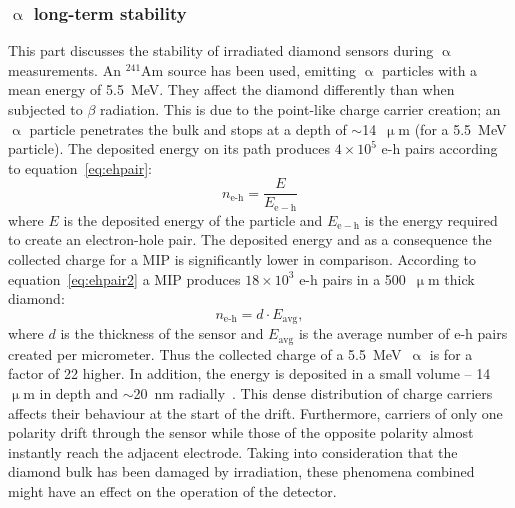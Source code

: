 \subsubsection{$\upalpha$ long-term stability}
This part discusses the stability of irradiated diamond sensors during $\upalpha$ measurements. An $^{241}$Am source has been used, emitting $\upalpha$ particles with a mean energy of 5.5~MeV. They affect the diamond differently than when subjected to $\beta$ radiation. This is due to the point-like charge carrier creation; an $\upalpha$ particle penetrates the bulk and stops at a depth of $\sim$14~$\upmu$m (for a 5.5~MeV particle). The deposited energy on its path produces $4\times10^5$ e-h pairs according to equation~\ref{eq:ehpair}:
\begin{equation} 
\label{eq:ehpair}
n_\textrm{e-h}=\frac{E}{E_\mathrm{e-h} }
\end{equation}
where $E$ is the deposited energy of the particle and $E_\mathrm{e-h}$ is the energy required to create an electron-hole pair. The deposited energy and as a consequence the collected charge for a MIP is significantly lower in comparison. According to equation~\ref{eq:ehpair2} a MIP produces $18\times10^3$ e-h pairs in a 500~$\upmu$m thick diamond:
\begin{equation} 
\label{eq:ehpair2}
n_\textrm{e-h} = d \cdot E_\textrm{avg},
\end{equation} 
where $d$ is the thickness of the sensor and $E_\textrm{avg}$ is the average number of e-h pairs created per micrometer. Thus the collected charge of a 5.5~MeV~$\upalpha$ is for a factor of 22 higher. In addition, the energy is deposited in a small volume -- 14~$\upmu$m in depth and $\sim$20~nm radially~\cite{Jansen:1956431}. This dense distribution of charge carriers affects their behaviour at the start of the drift. Furthermore, carriers of only one polarity drift through the sensor while those of the opposite polarity almost instantly reach the adjacent electrode. Taking into consideration that the diamond bulk has been damaged by irradiation, these phenomena combined might have an effect on the operation of the detector.


